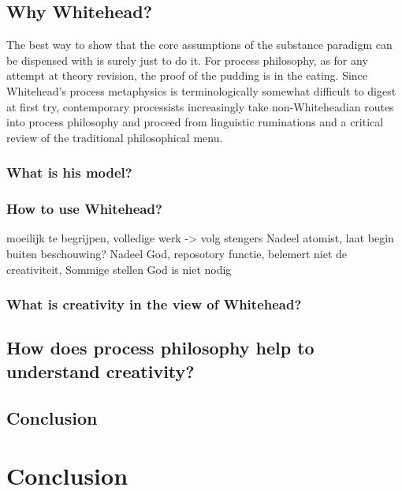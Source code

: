 \subsection{Why Whitehead?}
The best way to show that the core assumptions of the substance paradigm can be dispensed with is surely just to do it. For process philosophy, as for any attempt at theory revision, the proof of the pudding is in the eating. Since Whitehead's process metaphysics is terminologically somewhat difficult to digest at first try, contemporary processists increasingly take non-Whiteheadian routes into process philosophy and proceed from linguistic ruminations and a critical review of the traditional philosophical menu.
\subsubsection{What is his model?}
\subsubsection{How to use Whitehead?}
	moeilijk te begrijpen, volledige werk -> volg stengers
	Nadeel atomist, laat begin buiten beschouwing?
	Nadeel God, reposotory functie, belemert niet de creativiteit, Sommige stellen God is niet nodig
\subsubsection{What is creativity in the view of Whitehead?}	

\subsection{How does process philosophy help to understand creativity?}
\subsection{Conclusion}

\section{Conclusion}
